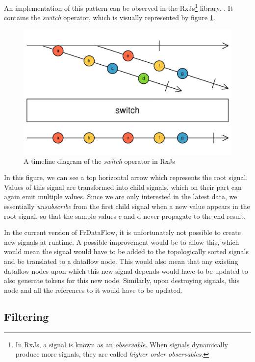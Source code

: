 An implementation of this pattern can be observed in the RxJs\footnote{In RxJs, a signal is known as an \textit{observable}. When signals dynamically produce more signals, they are called \textit{higher order observables}.} library. \citep{_observable_2017}. It contains the \textit{switch} operator, which is visually represented by figure \ref{fig:futurework-dynamicsignals-switch}.

\begin{figure}[h!]
	\includegraphics[width=\textwidth]{images/FutureWork-DynamicSignals-Switch.png}
	\caption{A timeline diagram of the \textit{switch} operator in RxJs}
	\label{fig:futurework-dynamicsignals-switch}
\end{figure}

In this figure, we can see a top horizontal arrow which represents the root signal. Values of this signal are transformed into child signals, which on their part can again emit multiple values. 
Since we are only interested in the latest data, we essentially \textit{unsubscribe} from the first child signal when a new value appears in the root signal, so that the sample values c and d never propagate to the end result. 

In the current version of FrDataFlow, it is unfortunately not possible to create new signals at runtime. A possible improvement would be to allow this, which would mean the signal would have to be added to the topologically sorted signals and be translated to a dataflow node. This would also mean that any existing dataflow nodes upon which this new signal depends would have to be updated to also generate tokens for this new node. Similarly, upon destroying signals, this node and all the references to it would have to be updated.

\subsection{Filtering}

